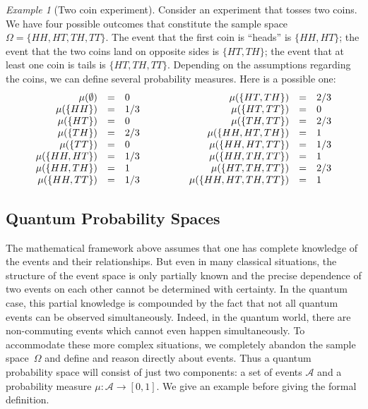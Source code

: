 \documentclass{article}
\theoremstyle{remark}
\newtheorem{example}{Example}
\newcommand{\qevents}{\ensuremath{\mathcal{A}}}
\newcommand{\pmeas}{\ensuremath{\mu}}
\begin{document}
\begin{example}[Two coin experiment] Consider an experiment that
  tosses two coins. We have four possible outcomes that constitute the
  sample space $\Omega = \{ HH, HT, TH, TT \}$. The event that the
  first coin is ``heads'' is $\{ HH, HT \}$; the event that the two
  coins land on opposite sides is $\{ HT, TH \}$; the event that at
  least one coin is tails is $\{ HT, TH, TT\}$. Depending on the
  assumptions regarding the coins, we can define several probability
  measures. Here is a possible one:
\[\begin{array}{c@{\qquad\qquad}c}
\begin{array}{rcl}
\pmeas(\emptyset) &=& 0 \\
\pmeas(\{ HH \}) &=& 1/3 \\
\pmeas(\{ HT \}) &=& 0 \\
\pmeas(\{ TH \}) &=& 2/3 \\
\pmeas(\{ TT \}) &=& 0 \\
\pmeas(\{  HH, HT \}) &=& 1/3 \\
\pmeas(\{  HH, TH \}) &=& 1 \\
\pmeas(\{  HH , TT \}) &=& 1/3 
\end{array} & \begin{array}{rcl}
\pmeas(\{  HT, TH \}) &=& 2/3 \\
\pmeas(\{  HT , TT \}) &=& 0 \\
\pmeas(\{  TH , TT \}) &=& 2/3 \\
\pmeas(\{  HH, HT, TH \}) &=& 1 \\
\pmeas(\{  HH, HT, TT \}) &=& 1/3 \\
\pmeas(\{  HH, TH, TT \}) &=& 1 \\
\pmeas(\{  HT, TH, TT \}) &=& 2/3 \\
\pmeas(\{  HH, HT, TH, TT \}) &=& 1
\end{array}
\end{array}\]
\end{example}

\subsection{Quantum Probability Spaces}

The mathematical framework above assumes that one has complete
knowledge of the events and their relationships. But even in many
classical situations, the structure of the event space is only
partially known and the precise dependence of two events on each other
cannot be determined with certainty. In the quantum case, this partial
knowledge is compounded by the fact that not all quantum events can be
observed simultaneously.  Indeed, in the quantum world, there are
non-commuting events which cannot even happen simultaneously. To
accommodate these more complex situations, we completely abandon the
sample space~$\Omega$ and define and reason directly about
events. Thus a quantum probability space will consist of just two
components: a set of events $\qevents$ and a probability measure
$\mu : \qevents \rightarrow [0,1]$. We give an example before giving
the formal definition.
\end{document}
